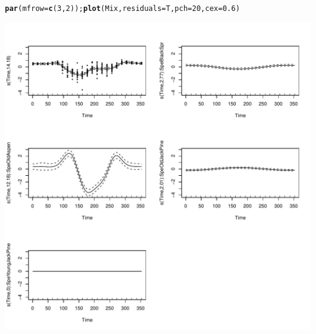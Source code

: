 \documentclass{article}\usepackage[]{graphicx}\usepackage[]{color}
\makeatletter
\def\maxwidth{ %
  \ifdim\Gin@nat@width>\linewidth
    \linewidth
  \else
    \Gin@nat@width
  \fi
}
\newcommand{\hlnum}[1]{\textcolor[rgb]{0.686,0.059,0.569}{#1}}%
\newcommand{\hlstd}[1]{\textcolor[rgb]{0.345,0.345,0.345}{#1}}%
\newcommand{\hlkwc}[1]{\textcolor[rgb]{0.333,0.667,0.333}{#1}}%
\newcommand{\hlkwd}[1]{\textcolor[rgb]{0.737,0.353,0.396}{\textbf{#1}}}%
\newenvironment{kframe}{%
 \def\at@end@of@kframe{}%
 \ifinner\ifhmode%
  \def\at@end@of@kframe{\end{minipage}}%
  \begin{minipage}{\columnwidth}%
 \fi\fi%
 \def\FrameCommand##1{\hskip\@totalleftmargin \hskip-\fboxsep
 \colorbox{shadecolor}{##1}\hskip-\fboxsep
     \hskip-\linewidth \hskip-\@totalleftmargin \hskip\columnwidth}%
 \MakeFramed {\advance\hsize-\width
   \@totalleftmargin\z@ \linewidth\hsize
   \@setminipage}}%
 {\par\unskip\endMakeFramed%
 \at@end@of@kframe}
\newenvironment{knitrout}{}{} %
\makeatother
\begin{document}
\begin{appendices}
\begin{knitrout}
\color{fgcolor}\begin{kframe}
\begin{alltt}
\hlkwd{par}\hlstd{(}\hlkwc{mfrow}\hlstd{=}\hlkwd{c}\hlstd{(}\hlnum{3}\hlstd{,}\hlnum{2}\hlstd{));}\hlkwd{plot}\hlstd{(Mix,}\hlkwc{residuals}\hlstd{=T,}\hlkwc{pch}\hlstd{=}\hlnum{20}\hlstd{,}\hlkwc{cex}\hlstd{=}\hlnum{0.6}\hlstd{)}
\end{alltt}
\end{kframe}
\includegraphics[width=\maxwidth]{figure/unnamed-chunk-13-1} 

\end{knitrout}


\end{appendices}
\end{document}
